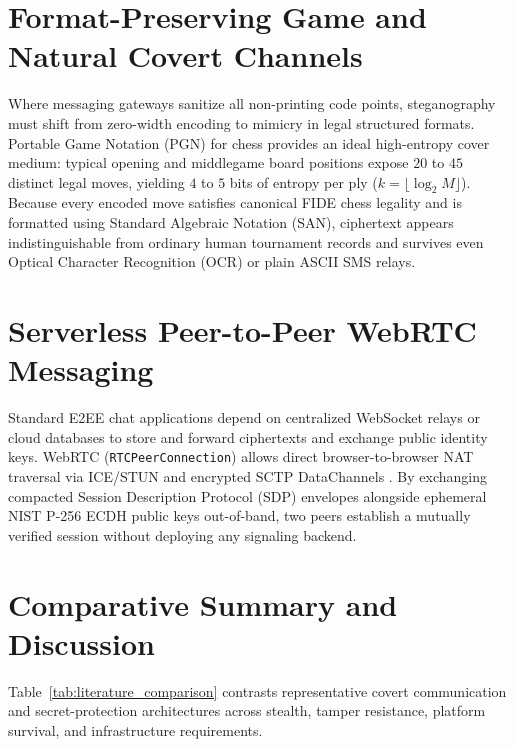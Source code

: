 \documentclass[12pt,a4paper,oneside,openany]{report}
\begin{document}
\section{Format-Preserving Game and Natural Covert Channels}
Where messaging gateways sanitize all non-printing code points, steganography must shift from zero-width encoding to mimicry in legal structured formats. Portable Game Notation (PGN) for chess provides an ideal high-entropy cover medium: typical opening and middlegame board positions expose $20$ to $45$ distinct legal moves, yielding $4$ to $5$ bits of entropy per ply ($k = \lfloor \log_2 M \rfloor$). Because every encoded move satisfies canonical FIDE chess legality and is formatted using Standard Algebraic Notation (SAN), ciphertext appears indistinguishable from ordinary human tournament records and survives even Optical Character Recognition (OCR) or plain ASCII SMS relays.

\section{Serverless Peer-to-Peer WebRTC Messaging}
Standard E2EE chat applications depend on centralized WebSocket relays or cloud databases to store and forward ciphertexts and exchange public identity keys. WebRTC (\texttt{RTCPeerConnection}) allows direct browser-to-browser NAT traversal via ICE/STUN and encrypted SCTP DataChannels \cite{w3c_webrtc}. By exchanging compacted Session Description Protocol (SDP) envelopes alongside ephemeral NIST P-256 ECDH public keys \cite{nist_ecdh} out-of-band, two peers establish a mutually verified session without deploying any signaling backend.

\section{Comparative Summary and Discussion}
Table~\ref{tab:literature_comparison} contrasts representative covert communication and secret-protection architectures across stealth, tamper resistance, platform survival, and infrastructure requirements.
\end{document}
